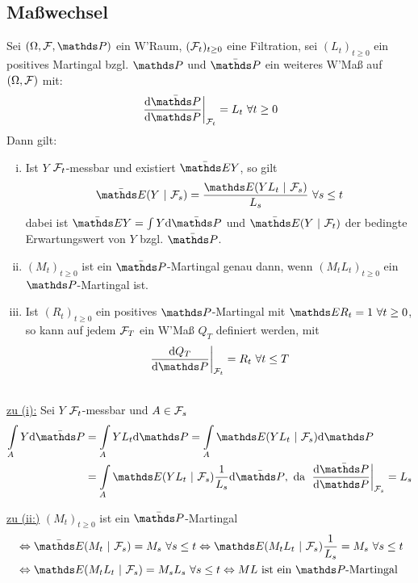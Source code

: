 \subsection{Maßwechsel}
\label{sub:masswechsel}
Sei $(\Omega,\F,\Pw)$ ein W'Raum, $(\mathcal{F}_t)_{t\ge 0}$ eine Filtration, sei $(L_t)_{t\ge0}$ ein positives Martingal bzgl. $\Pw$ und $\bar{\Pw}$ ein weiteres W'Maß auf $(\Omega,\mathcal{F})$ mit:
\[
\left.\frac{\dint \bar{\Pw}}{\dint \Pw}\right|_{\F_t}=L_t~\forall t\ge 0
\]
Dann gilt:
\begin{enumerate}[(i)]
	\item Ist $Y$ $\mathcal{F}_t$-messbar und existiert $\bar{\E}Y$, so gilt
	\[
	\bar{\E}(Y~|~\F_s)=\frac{\E(YL_t~|~\F_s)}{L_s}~\forall s\le t
	\]
	dabei ist $\bar{\E}Y=\int Y\dint \bar{\Pw}$ und $\bar{\E}(Y~|~\F_t)$ der bedingte Erwartungswert von $Y$ bzgl. $\bar{\Pw}$.
	\item $(M_t)_{t\ge0}$ ist ein $\bar{\Pw}$-Martingal genau dann, wenn $(M_tL_t)_{t\ge0}$ ein $\Pw$-Martingal ist.
	\item Ist $(R_t)_{t\ge 0}$ ein positives $\Pw$-Martingal mit $\E R_t=1~\forall t\ge 0$, so kann auf jedem $\mathcal{F}_T$ ein W'Maß $Q_T$ definiert werden, mit
	\[
	\left.\frac{\dint Q_T}{\dint \Pw}\right|_{\F_t}=R_t~\forall t\le T
	\]
\end{enumerate}

\\
\uline{zu (i):}
Sei $Y$ $\mathcal{F}_t$-messbar und $A\in \mathcal{F}_s$
\begin{equation*}
\begin{aligned}
	\int\ablim{A}Y\dint \bar{\Pw} &= \int\ablim{A}YL_t\dint\Pw = \int\ablim{A}\E(YL_t~|~\F_s)\dint\Pw\\
	&= \int\ablim{A}\E(YL_t~|~\F_s)\frac{1}{L_s}\dint\bar{\Pw}, \text{ da } \left.\frac{\dint \bar{\Pw}}{\dint \Pw}\right|_{\F_s}=L_s
\end{aligned}
\end{equation*}

\uline{zu (ii:)}
$(M_t)_{t\ge0}$ ist ein $\bar{\Pw}$-Martingal
\begin{equation*}
\begin{aligned}
	&\Leftrightarrow \bar{\E}(M_t~|~\F_s)=M_s~\forall s\le t \Leftrightarrow \E(M_tL_t~|~\F_s)\frac{1}{L_s}=M_s~\forall s\le t\\
	&\Leftrightarrow \E(M_tL_t~|~\F_s)=M_sL_s~\forall s\le t \Leftrightarrow ML \text{ ist ein }\Pw\text{-Martingal}
\end{aligned}
\end{equation*}

